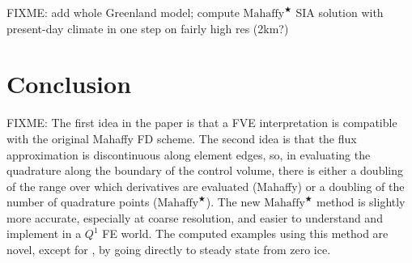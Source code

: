 \documentclass[11pt]{amsart}
\newcommand{\Mstar}{$\text{Mahaffy}^{\bigstar}$\xspace}
\begin{document}
FIXME: add whole Greenland model; compute \Mstar SIA solution with present-day climate in one step on fairly high res (2km?)


\section{Conclusion} \label{sec:conclusion}

FIXME: The first idea in the paper is that a FVE interpretation is compatible with the original Mahaffy FD scheme.  The second idea is that the flux approximation is discontinuous along element edges, so, in evaluating the quadrature along the boundary of the control volume, there is either a doubling of the range over which derivatives are evaluated (Mahaffy) or a doubling of the number of quadrature points (\Mstar).  The new \Mstar method is slightly more accurate, especially at coarse resolution, and easier to understand and implement in a $Q^1$ FE world.  The computed examples using this method are novel, except for \cite{JouvetBueler2012}, by going directly to steady state from zero ice.





\begin{comment}
Here is what the MPAS Land-Ice User's Manual version 3.0 says:

\begin{quote}
\small
Velocities and fluxes are calculated on the midpoint of Voronoi cell edges.  The normal component of surface slope is calculated on cell edges using surface elevation at adjacent cell centers.  The tangential component of surface slope is calculated on cell edges using surface elevation at adjacent vertices. The surface elevation at vertices is calculated from the values at adjacent cell centers using barycentric interpolation. Ice thickness on edges is calculated as the average of the adjacent cell center values (2nd-order approximation).
\end{quote}

Looking at this, and the code, I don't think they think of it as Petrov-Galerkin
\end{comment}
\end{document}
